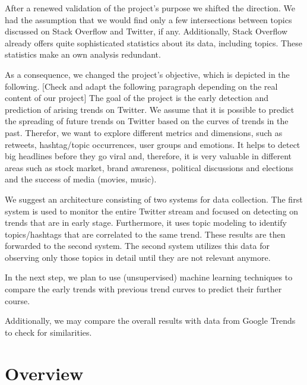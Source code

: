 After a renewed validation of the project’s purpose we shifted the direction. We had the assumption that we would find only a few intersections between topics discussed on Stack Overflow and Twitter, if any. Additionally, Stack Overflow already offers quite sophisticated statistics about its data, including topics. These statistics make an own analysis redundant.

As a consequence, we changed the project’s objective, which is depicted in the following.
[Check and adapt the following paragraph depending on the real content of our project]
The goal of the project is the early detection and prediction of arising trends on Twitter.
We assume that it is possible to predict the spreading of future trends on Twitter based on the curves of trends in the past. 
Therefor, we want to explore different metrics and dimensions, such as retweets, hashtag/topic occurrences, user groups and emotions.
It helps to detect big headlines before they go viral and, therefore, it is very valuable in different areas such as stock market, brand awareness, political discussions and elections and the success of media (movies, music). 

We suggest an architecture consisting of two systems for data collection. 
The first system is used to monitor the entire Twitter stream and focused on detecting on trends that are in early stage. Furthermore, it uses topic modeling to identify topics/hashtags that are correlated to the same trend.
These results are then forwarded to the second system. The second system utilizes this data for observing only those topics in detail until they are not relevant anymore. 

In the next step, we plan to use (unsupervised) machine learning techniques to compare the early trends with previous trend curves to predict their further course.

Additionally, we may compare the overall results with data from Google Trends to check for similarities.


\section{Overview}
\label{sec:overview}